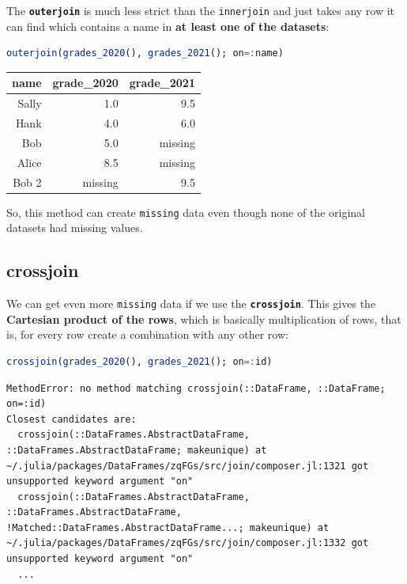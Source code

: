 \documentclass[
  notoc %
]{tufte-book}
\newcommand{\passthrough}[1]{#1}
\begin{document}
The \textbf{\passthrough{\lstinline!outerjoin!}} is much less strict
than the \passthrough{\lstinline!innerjoin!} and just takes any row it
can find which contains a name in \textbf{at least one of the datasets}:

\begin{lstlisting}[language=Julia]
outerjoin(grades_2020(), grades_2021(); on=:name)
\end{lstlisting}

\begin{longtable}[]{@{}rrr@{}}
\toprule
name & grade\_2020 & grade\_2021 \\
\midrule
\endhead
Sally & 1.0 & 9.5 \\
Hank & 4.0 & 6.0 \\
Bob & 5.0 & missing \\
Alice & 8.5 & missing \\
Bob 2 & missing & 9.5 \\
\bottomrule
\end{longtable}

So, this method can create \passthrough{\lstinline!missing!} data even
though none of the original datasets had missing values.

\hypertarget{sec:crossjoin}{%
\subsection{crossjoin}\label{sec:crossjoin}}

We can get even more \passthrough{\lstinline!missing!} data if we use
the \textbf{\passthrough{\lstinline!crossjoin!}}. This gives the
\textbf{Cartesian product of the rows}, which is basically
multiplication of rows, that is, for every row create a combination with
any other row:

\begin{lstlisting}[language=Julia]
crossjoin(grades_2020(), grades_2021(); on=:id)
\end{lstlisting}

\begin{lstlisting}[language=Output]
MethodError: no method matching crossjoin(::DataFrame, ::DataFrame; on=:id)
Closest candidates are:
  crossjoin(::DataFrames.AbstractDataFrame, ::DataFrames.AbstractDataFrame; makeunique) at ~/.julia/packages/DataFrames/zqFGs/src/join/composer.jl:1321 got unsupported keyword argument "on"
  crossjoin(::DataFrames.AbstractDataFrame, ::DataFrames.AbstractDataFrame, !Matched::DataFrames.AbstractDataFrame...; makeunique) at ~/.julia/packages/DataFrames/zqFGs/src/join/composer.jl:1332 got unsupported keyword argument "on"
  ...
\end{lstlisting}
\end{document}
